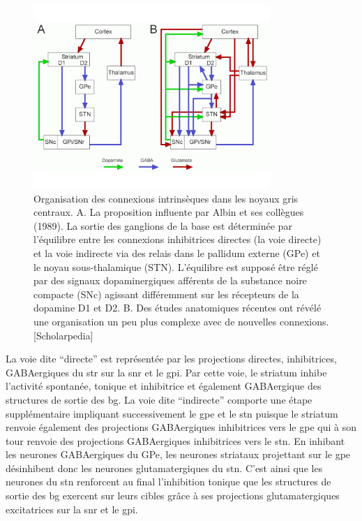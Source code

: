 \begin{figure}
\begin{center}
\includegraphics[width=0.8\textwidth]{figures/ch4_4_Bg3}
\end{center}
\caption{Organisation des connexions intrinsèques dans les noyaux gris centraux. A. La proposition influente par Albin et ses collègues (1989). La sortie des ganglions de la base est déterminée par l'équilibre entre les connexions inhibitrices directes (la voie directe) et la voie indirecte via des relais dans le pallidum externe (GPe) et le noyau sous-thalamique (STN). L'équilibre est supposé être réglé par des signaux dopaminergiques afférents de la substance noire compacte (SNc) agissant différemment sur les récepteurs de la dopamine D1 et D2. B. Des études anatomiques récentes ont révélé une organisation un peu plus complexe avec de nouvelles connexions.[Scholarpedia]}
\label{Albin}
\end{figure}

La voie dite ``directe'' est représentée par les projections directes, inhibitrices, GABAergiques du \gls{str} sur la \gls{snr} et le \gls{gpi}. Par cette voie, le striatum inhibe l'activité spontanée, tonique et inhibitrice et également GABAergique des structures de sortie des \gls{bg}. La voie dite ``indirecte'' comporte une étape supplémentaire impliquant successivement le \gls{gpe} et le \gls{stn} puisque le striatum renvoie également des projections GABAergiques inhibitrices vers le \gls{gpe} qui à son tour renvoie des projections GABAergiques inhibitrices vers le \gls{stn}. En inhibant les neurones GABAergiques du GPe, les neurones striataux projettant sur le \gls{gpe} désinhibent donc les neurones glutamatergiques du \gls{stn}. C'est ainsi que les neurones du \gls{stn} renforcent au final l'inhibition tonique que les structures de sortie des \gls{bg} exercent sur leurs cibles grâce à ses projections glutamatergiques excitatrices sur la \gls{snr} et le \gls{gpi}.\\

